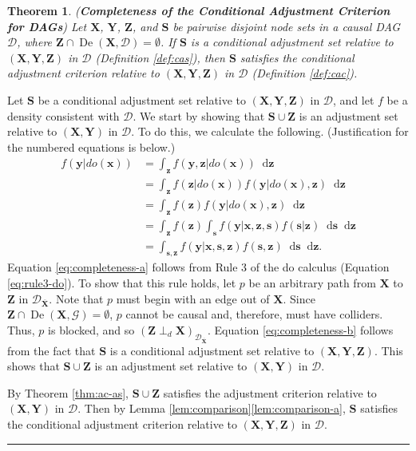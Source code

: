 \documentclass[twoside]{article}
\newtheorem{theorem}{Theorem}
\DeclareMathOperator{\De}{De}
\newcommand{\mb}[1]{\mathbf{#1}}
\newcommand{\dsepp}{\perp_{d}}
\newcommand{\g}[1][G]{\mathcal{#1}}
\newcommand*\diff{\mathop{}\!\mathrm{d}}
\newenvironment{proofof}[1][]{\begin{trivlist}
\item[\hskip \labelsep {\bfseries Proof of #1.}]}{\hfill\BlackBox\end{trivlist}}
\newcommand{\BlackBox}{\rule{1.5ex}{1.5ex}}
\begin{document}

\begin{theorem}
\label{thm:completeness}
{\normalfont (\textbf{Completeness of the Conditional Adjustment Criterion for DAGs})}
    Let $\mb{X}$, $\mb{Y}$, $\mb{Z}$, and $\mb{S}$ be pairwise disjoint node sets in a causal DAG $\g[D]$, where $\mb{Z} \cap \De(\mb{X}, \g[D]) = \emptyset$. If $\mb{S}$ is a conditional adjustment set relative to $(\mb{X,Y,Z})$ in $\g[D]$ (Definition \ref{def:cas}), then $\mb{S}$ satisfies the conditional adjustment criterion relative to $(\mb{X,Y,Z})$ in $\g[D]$ (Definition \ref{def:cac}).
\end{theorem}


\begin{proofof}[Theorem \ref{thm:completeness}]
    Let $\mb{S}$ be a conditional adjustment set relative to $(\mb{X,Y,Z})$ in $\g[D]$, and let $f$ be a density consistent with $\g[D]$. We start by showing that $\mb{S} \cup \mb{Z}$ is an adjustment set relative to $(\mb{X,Y})$ in $\g[D]$. To do this, we calculate the following. (Justification for the numbered equations is below.)
    \begin{align}
        f(\mb{y}|do(\mb{x})) 
                &= \int_{\mb{z}} f(\mb{y,z} | do(\mb{x})) \diff \mb{z} \nonumber \\
                &= \int_{\mb{z}} f(\mb{z} | do(\mb{x})) f(\mb{y} | do(\mb{x}), \mb{z}) \diff \mb{z} \nonumber \\
                &= \int_{\mb{z}} f(\mb{z}) f(\mb{y} | do(\mb{x}), \mb{z}) \diff \mb{z} \label{eq:completeness-a} \\
                &= \int_{\mb{z}} f(\mb{z}) \int_{\mb{s}} f(\mb{y} | \mb{x,z,s}) f(\mb{s} | \mb{z}) \diff \mb{s} \diff \mb{z} \label{eq:completeness-b} \\
                &= \int_{\mb{s,z}} f(\mb{y} | \mb{x,s,z}) f(\mb{s,z}) \diff \mb{s} \diff \mb{z} \nonumber.
    \end{align}
    Equation \eqref{eq:completeness-a} follows from Rule 3 of the do calculus (Equation \eqref{eq:rule3-do}). To show that this rule holds, let $p$ be an arbitrary path from $\mb{X}$ to $\mb{Z}$ in $\g[D]_{\overline{\mb{X}}}$. Note that $p$ must begin with an edge out of $\mb{X}$. Since $\mb{Z} \cap \De(\mb{X}, \g) = \emptyset$, $p$ cannot be causal and, therefore, must have colliders. Thus, $p$ is blocked, and so $(\mb{Z} \dsepp \mb{X})_{\g[D]_{\overline{\mb{X}}}}$. Equation \eqref{eq:completeness-b} follows from the fact that $\mb{S}$ is a conditional adjustment set relative to $(\mb{X,Y,Z})$. This shows that $\mb{S} \cup \mb{Z}$ is an adjustment set relative to $(\mb{X,Y})$ in $\g[D]$. 

    By Theorem \ref{thm:ac-as}, $\mb{S} \cup \mb{Z}$ satisfies the adjustment criterion relative to $(\mb{X,Y})$ in $\g[D]$. Then by Lemma \ref{lem:comparison}\ref{lem:comparison-a}, $\mb{S}$ satisfies the conditional adjustment criterion relative to $(\mb{X,Y,Z})$ in $\g[D]$.
\end{proofof}
\end{document}
